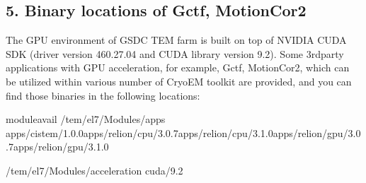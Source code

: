\documentclass[a4paper,11pt,english]{sphinxmanual}
\begin{document}
\subsection{5. Binary locations of Gctf, MotionCor2}
\label{\detokenize{cryoSPARC:binary-locations-of-gctf-motioncor2}}
\sphinxAtStartPar
The GPU environment of GSDC TEM farm is built on top of NVIDIA CUDA SDK (driver version 460.27.04 and CUDA library version 9.2).
Some 3rd\sphinxhyphen{}party applications with GPU acceleration, for example, Gctf, MotionCor2, which can be utilized within various number of Cryo\sphinxhyphen{}EM toolkit are provided, and
you can find those binaries in the following locations:

\begin{sphinxVerbatim}[commandchars=\\\{\}]

\PYGZdl{}\PYGZgt{}moduleavail
\PYGZhy{}\PYGZhy{}\PYGZhy{}\PYGZhy{}\PYGZhy{}\PYGZhy{}\PYGZhy{}\PYGZhy{}\PYGZhy{}\PYGZhy{}\PYGZhy{}\PYGZhy{}\PYGZhy{}\PYGZhy{}\PYGZhy{}\PYGZhy{}\PYGZhy{}\PYGZhy{}\PYGZhy{}\PYGZhy{}\PYGZhy{}\PYGZhy{}\PYGZhy{}\PYGZhy{}\PYGZhy{}\PYGZhy{}\PYGZhy{}\PYGZhy{}\PYGZhy{}\PYGZhy{}\PYGZhy{}\PYGZhy{}\PYGZhy{}\PYGZhy{}\PYGZhy{}\PYGZhy{}\PYGZhy{}\PYGZhy{}\PYGZhy{}\PYGZhy{}\PYGZhy{}\PYGZhy{}\PYGZhy{}\PYGZhy{}\PYGZhy{}\PYGZhy{}\PYGZhy{}\PYGZhy{}/tem/el7/Modules/apps\PYGZhy{}\PYGZhy{}\PYGZhy{}\PYGZhy{}\PYGZhy{}\PYGZhy{}\PYGZhy{}\PYGZhy{}\PYGZhy{}\PYGZhy{}\PYGZhy{}\PYGZhy{}\PYGZhy{}\PYGZhy{}\PYGZhy{}\PYGZhy{}\PYGZhy{}\PYGZhy{}\PYGZhy{}\PYGZhy{}\PYGZhy{}\PYGZhy{}\PYGZhy{}\PYGZhy{}\PYGZhy{}\PYGZhy{}\PYGZhy{}\PYGZhy{}\PYGZhy{}\PYGZhy{}\PYGZhy{}\PYGZhy{}\PYGZhy{}\PYGZhy{}\PYGZhy{}\PYGZhy{}\PYGZhy{}\PYGZhy{}\PYGZhy{}\PYGZhy{}\PYGZhy{}\PYGZhy{}\PYGZhy{}\PYGZhy{}\PYGZhy{}\PYGZhy{}\PYGZhy{}\PYGZhy{}
apps/cistem/1.0.0apps/relion/cpu/3.0.7apps/relion/cpu/3.1.0apps/relion/gpu/3.0.7apps/relion/gpu/3.1.0

\PYGZhy{}\PYGZhy{}\PYGZhy{}\PYGZhy{}\PYGZhy{}\PYGZhy{}\PYGZhy{}\PYGZhy{}\PYGZhy{}\PYGZhy{}\PYGZhy{}\PYGZhy{}\PYGZhy{}\PYGZhy{}\PYGZhy{}\PYGZhy{}\PYGZhy{}\PYGZhy{}\PYGZhy{}\PYGZhy{}\PYGZhy{}\PYGZhy{}\PYGZhy{}\PYGZhy{}\PYGZhy{}\PYGZhy{}\PYGZhy{}\PYGZhy{}\PYGZhy{}\PYGZhy{}\PYGZhy{}\PYGZhy{}\PYGZhy{}\PYGZhy{}\PYGZhy{}\PYGZhy{}\PYGZhy{}\PYGZhy{}\PYGZhy{}\PYGZhy{}\PYGZhy{}\PYGZhy{}\PYGZhy{}\PYGZhy{}/tem/el7/Modules/acceleration\PYGZhy{}\PYGZhy{}\PYGZhy{}\PYGZhy{}\PYGZhy{}\PYGZhy{}\PYGZhy{}\PYGZhy{}\PYGZhy{}\PYGZhy{}\PYGZhy{}\PYGZhy{}\PYGZhy{}\PYGZhy{}\PYGZhy{}\PYGZhy{}\PYGZhy{}\PYGZhy{}\PYGZhy{}\PYGZhy{}\PYGZhy{}\PYGZhy{}\PYGZhy{}\PYGZhy{}\PYGZhy{}\PYGZhy{}\PYGZhy{}\PYGZhy{}\PYGZhy{}\PYGZhy{}\PYGZhy{}\PYGZhy{}\PYGZhy{}\PYGZhy{}\PYGZhy{}\PYGZhy{}\PYGZhy{}\PYGZhy{}\PYGZhy{}\PYGZhy{}\PYGZhy{}\PYGZhy{}\PYGZhy{}\PYGZhy{}
cuda/9.2


\end{sphinxVerbatim}
\end{document}
